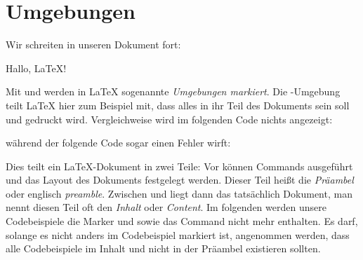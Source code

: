 \section{Umgebungen}
Wir schreiten in unseren Dokument fort:
\begin{latexlisting}
	
		Hallo, LaTeX!
	
\end{latexlisting}
Mit  und  werden in \LaTeX{} sogenannte \emph{Umgebungen markiert}.
Die -Umgebung teilt \LaTeX{} hier zum Beispiel mit, dass alles in ihr Teil des Dokuments sein soll und gedruckt wird.
Vergleichweise wird im folgenden Code nichts angezeigt:
während der folgende Code sogar einen Fehler wirft:
Dies teilt ein \LaTeX{}-Dokument in zwei Teile:
Vor  können Commands ausgeführt und das Layout des Dokuments festgelegt werden.
Dieser Teil heißt die \emph{Präambel} oder englisch \emph{preamble}.
Zwischen  und  liegt dann das tatsächlich Dokument, man nennt diesen Teil oft den \emph{Inhalt} oder \emph{Content}.
Im folgenden werden unsere Codebeispiele die Marker  und  sowie das Command  nicht mehr enthalten.
Es darf, solange es nicht anders im Codebeispiel markiert ist, angenommen werden, dass alle Codebeispiele im Inhalt und nicht in der Präambel existieren sollten. 

